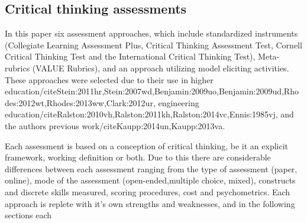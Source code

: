 \subsection{Critical thinking assessments}

In this paper six assessment approaches, which include standardized instruments (Collegiate Learning Assessment Plus, Critical Thinking Assessment Test, Cornell Critical Thinking Test and the International Critical Thinking Test), Meta-rubrics (VALUE Rubrics), and an approach utilizing model eliciting activities.  These approaches were selected due to their use in higher education/cite{Stein:2011hr,Stein:2007wd,Benjamin:2009uo,Benjamin:2009ud,Rhodes:2012wt,Rhodes:2013ww,Clark:2012ur}, engineering education/cite{Ralston:2010vh,Ralston:2011kh,Ralston:2014vc,Ennis:1985vj}, and the authors previous work/cite{Kaupp:2014un,Kaupp:2013va}.

Each assessment is based on a conception of critical thinking, be it an explicit framework, working definition or both.  Due to this there are considerable differences between each assessment ranging from the type of assessment (paper, online), mode of the assessment (open-ended,multiple choice, mixed), constructs and discrete skills measured, scoring procedures, cost and psychometrics.   Each approach is replete with it’s own strengths and weaknesses, and in the following sections each 
